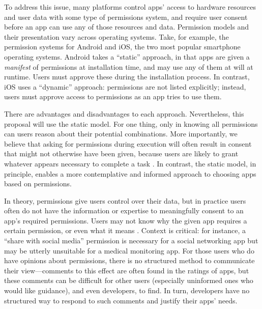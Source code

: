 \documentclass[11pt]{article}
\begin{document}
To address this issue, many
platforms control apps' access to hardware resources 
and user data with some type of permissions system,
and require user consent before an app can use any
of those resources and data. Permission models and their presentation 
vary across operating systems. Take, for example, the permission systems
for Android and iOS, the two most popular smartphone operating systems. 
Android takes a ``static'' approach, in that apps are given a
\emph{manifest} of
permissions at installation time, and may use any of them at will at runtime.
Users must approve these during the installation
process. In contrast, iOS uses a ``dynamic''
approach: permissions are not listed explicitly; instead, users must
approve access to permissions as an app tries to use them.

There are advantages and disadvantages to each approach. Nevertheless,
this proposal will use the static model. For one thing, only in 
knowing all permissions can users reason about their potential
combinations. More importantly, we believe that asking for permissions
during execution will often result in consent that might not otherwise
have been given, because users are likely to grant whatever appears
necessary to complete a task \cite{phisher-wanings-SIGCHI08}. In contrast, the static
model, in principle, enables a more contemplative and
informed approach to choosing apps based on permissions.

In theory, permissions give users control over their 
data, but in practice users often do not have the 
information or expertise to meaningfully consent to an 
app's required permissions. Users may not
know why the given app requires a certain permission, or
even what it means \cite{android-attention-SOUPS12}. 
Context is critical:
for instance, 
a ``share with social media'' permission is necessary for a social
networking app but may be utterly
unsuitable for a medical monitoring app. 
For those users who do have opinions about permissions, 
there is no structured method to
communicate their view---comments to this effect are often found in
the ratings of apps, but these comments can be difficult for other
users (especially uninformed ones who would like guidance), and even
developers, to find. In turn, developers have no structured way to
respond to such comments and justify their apps' needs.
\end{document}
